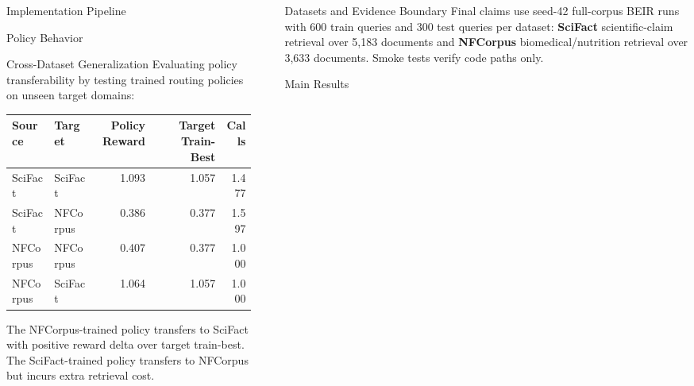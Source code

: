 \documentclass[final,20pt]{beamer}
\newlength{\sepwidth}
\newlength{\colwidth}
\newcommand{\separatorcolumn}{\begin{column}{\sepwidth}\end{column}}
\begin{document}
\begin{frame}[t]
\begin{columns}[t]
\begin{column}{\colwidth}
  \begin{block}{Implementation Pipeline}
    
  \end{block}

  \begin{block}{Policy Behavior}
    
  \end{block}

  \begin{block}{Cross-Dataset Generalization}
    Evaluating policy transferability by testing trained routing policies on unseen target domains:
    \vspace{0.25em}
    \begin{table}
      \centering
      \small
      \begin{tabular}{l l r r r}
        \toprule
        \textbf{Source} & \textbf{Target} & \textbf{Policy Reward} & \textbf{Target Train-Best} & \textbf{Calls} \\
        \midrule
        SciFact & SciFact & 1.093 & 1.057 & 1.477 \\
        SciFact & NFCorpus & 0.386 & 0.377 & 1.597 \\
        NFCorpus & NFCorpus & 0.407 & 0.377 & 1.000 \\
        NFCorpus & SciFact & 1.064 & 1.057 & 1.000 \\
        \bottomrule
      \end{tabular}
    \end{table}
    \vspace{0.25em}
    \small The NFCorpus-trained policy transfers to SciFact with positive reward delta over target train-best. The SciFact-trained policy transfers to NFCorpus but incurs extra retrieval cost.
  \end{block}

\end{column}

\separatorcolumn

\begin{column}{\colwidth}

  \begin{block}{Datasets and Evidence Boundary}
    Final claims use seed-42 full-corpus BEIR runs with 600 train queries and 300 test queries per dataset: \textbf{SciFact} scientific-claim retrieval over 5,183 documents and \textbf{NFCorpus} biomedical/nutrition retrieval over 3,633 documents. Smoke tests verify code paths only.
  \end{block}

  \begin{block}{Main Results}
    


\end{block}
\end{column}
\end{columns}
\end{frame}
\end{document}

